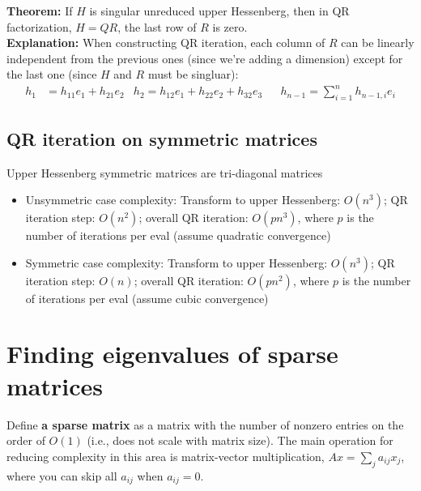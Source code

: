 \documentclass{article}
\begin{document}
\textbf{Theorem:} If $H$ is singular unreduced upper Hessenberg, then in QR factorization, $H=QR$, the last row of $R$ is zero.\\
\textbf{Explanation:} When constructing QR iteration, each column of $R$ can be linearly independent from the previous ones (since we're adding a dimension) except for the last one (since $H$ and $R$ must be singluar):
\begin{align*}
    h_1 &= h_{11}e_1 + h_{21}e_2 & h_2 = h_{12}e_1 + h_{22}e_2 + h_{32}e_3 && h_{n-1} = \sum_{i=1}^n h_{n-1,i}e_i
\end{align*}

\subsection{QR iteration on symmetric matrices}
Upper Hessenberg symmetric matrices are tri-diagonal matrices
\begin{itemize}
    \item Unsymmetric case complexity: Transform to upper Hessenberg: $O(n^3)$; QR iteration step: $O(n^2)$; overall QR iteration: $O(pn^3)$, where $p$ is the number of iterations per eval (assume quadratic convergence)
    \item Symmetric case complexity: Transform to upper Hessenberg: $O(n^3)$; QR iteration step: $O(n)$; overall QR iteration: $O(pn^2)$, where $p$ is the number of iterations per eval (assume cubic convergence) 
\end{itemize}


\section{Finding eigenvalues of sparse matrices}
Define \textbf{a sparse matrix} as a matrix with the number of nonzero entries on the order of $O(1)$ (i.e., does not scale with matrix size). The main operation for reducing complexity in this area is matrix-vector multiplication, $Ax = \sum_j a_{ij}x_j$, where you can skip all $a_{ij}$ when $a_{ij} = 0$. 
\end{document}
